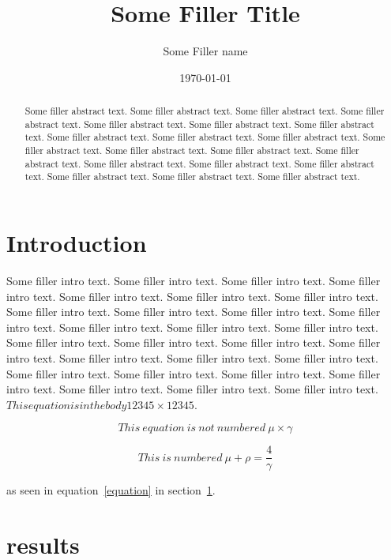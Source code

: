 \documentclass[11pt]{article}
\begin{document}
\title{Some Filler Title}
\author{Some Filler name}
\date{\today}
\maketitle

\begin{abstract}
Some filler abstract text. Some filler abstract text. Some filler abstract text. Some filler abstract text. Some filler abstract text. Some filler abstract text. Some filler abstract text. Some filler abstract text. Some filler abstract text. Some filler abstract text. Some filler abstract text. Some filler abstract text. Some filler abstract text. Some filler abstract text. Some filler abstract text. Some filler abstract text. Some filler abstract text. Some filler abstract text. Some filler abstract text. Some filler abstract text. 


\end{abstract}


\section{Introduction}
\label{Introduction}

Some filler intro text. Some filler intro text. Some filler intro text. Some filler intro text. Some filler intro text. Some filler intro text. Some filler intro text. Some filler intro text. Some filler intro text. Some filler intro text. Some filler intro text. Some filler intro text. Some filler intro text. Some filler intro text. Some filler intro text. Some filler intro text. Some filler intro text. Some filler intro text. Some filler intro text. Some filler intro text. Some filler intro text. Some filler intro text. Some filler intro text. Some filler intro text. Some filler intro text. Some filler intro text. Some filler intro text. Some filler intro text. $This equation is in the body 12345\times12345$.

$$This~equation~is~not~numbered~\mu\times\gamma$$

\begin{equation}
This~is~numbered~\mu + \rho = \frac{4}{\gamma}
\label{equation}
\end{equation}

as seen in equation~\ref{equation} in section~\ref{Introduction}.

\section{results}
\label{results}
\end{document}
